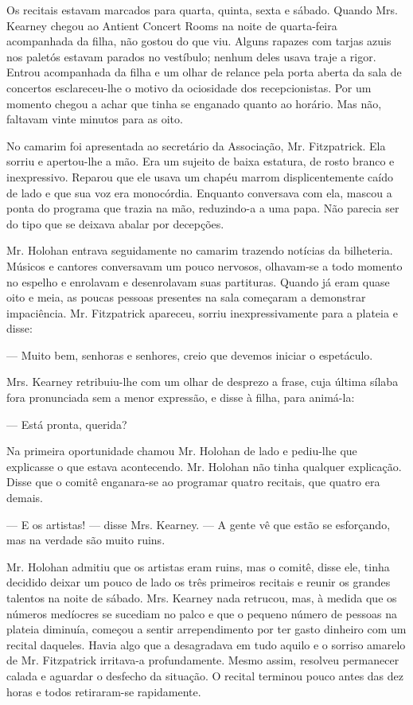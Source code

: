Os recitais estavam marcados para quarta, quinta, sexta e sábado.
Quando Mrs. Kearney chegou ao Antient Concert Rooms na noite de
quarta-feira acompanhada da filha, não gostou do que viu. Alguns
rapazes com tarjas azuis nos paletós estavam parados no vestíbulo;
nenhum deles usava traje a rigor. Entrou acompanhada da filha e um
olhar de relance pela porta aberta da sala de concertos esclareceu-lhe
o motivo da ociosidade dos recepcionistas. Por um momento chegou a
achar que tinha se enganado quanto ao horário. Mas não, faltavam vinte
minutos para as oito.

No camarim foi apresentada ao secretário da Associação, Mr.
Fitzpatrick. Ela sorriu e apertou-lhe a mão. Era um sujeito de baixa
estatura, de rosto branco e inexpressivo. Reparou que ele usava um
chapéu marrom displicentemente caído de lado e que sua voz era
monocórdia. Enquanto conversava com ela, mascou a ponta do programa
que trazia na mão, reduzindo-a a uma papa. Não parecia ser do tipo que
se deixava abalar por decepções.

Mr. Holohan entrava seguidamente no camarim trazendo notícias da
bilheteria. Músicos e cantores conversavam um pouco nervosos,
olhavam-se a todo momento no espelho e enrolavam e desenrolavam suas
partituras. Quando já eram quase oito e meia, as poucas pessoas
presentes na sala começaram a demonstrar impaciência. Mr. Fitzpatrick
apareceu, sorriu inexpressivamente para a plateia e disse:

--- Muito bem, senhoras e senhores, creio que devemos iniciar o
espetáculo.

Mrs. Kearney retribuiu-lhe com um olhar de desprezo a frase, cuja
última sílaba fora pronunciada sem a menor expressão, e disse à filha,
para animá-la:

--- Está pronta, querida?

Na primeira oportunidade chamou Mr. Holohan de lado e pediu-lhe que
explicasse o que estava acontecendo. Mr. Holohan não tinha qualquer
explicação. Disse que o comitê enganara-se ao programar quatro
recitais, que quatro era demais.

--- E os artistas! --- disse Mrs. Kearney. --- A gente vê que estão se
esforçando, mas na verdade são muito ruins.

Mr. Holohan admitiu que os artistas eram ruins, mas o comitê, disse
ele, tinha decidido deixar um pouco de lado os três primeiros recitais
e reunir os grandes talentos na noite de sábado. Mrs. Kearney nada
retrucou, mas, à medida que os números medíocres se sucediam no palco
e que o pequeno número de pessoas na plateia diminuía, começou a
sentir arrependimento por ter gasto dinheiro com um recital daqueles.
Havia algo que a desagradava em tudo aquilo e o sorriso amarelo de Mr.
Fitzpatrick irritava-a profundamente. Mesmo assim, resolveu permanecer
calada e aguardar o desfecho da situação. O recital terminou pouco
antes das dez horas e todos retiraram-se rapidamente.

